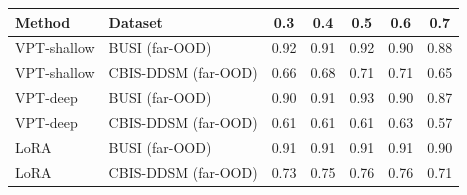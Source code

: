 \begin{tabular}{llccccc}
\toprule
Method & Dataset & 0.3 & 0.4 & 0.5 & 0.6 & 0.7 \\
\midrule
VPT-shallow & BUSI (far-OOD) & 0.92 & 0.91 & 0.92 & 0.90 & 0.88 \\
VPT-shallow & CBIS-DDSM (far-OOD) & 0.66 & 0.68 & 0.71 & 0.71 & 0.65 \\
VPT-deep & BUSI (far-OOD) & 0.90 & 0.91 & 0.93 & 0.90 & 0.87 \\
VPT-deep & CBIS-DDSM (far-OOD) & 0.61 & 0.61 & 0.61 & 0.63 & 0.57 \\
LoRA & BUSI (far-OOD) & 0.91 & 0.91 & 0.91 & 0.91 & 0.90 \\
LoRA & CBIS-DDSM (far-OOD) & 0.73 & 0.75 & 0.76 & 0.76 & 0.71 \\
\bottomrule
\end{tabular}
